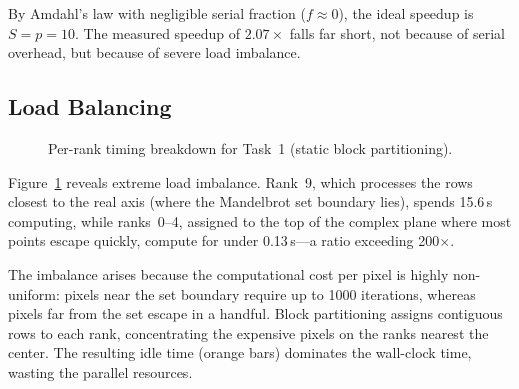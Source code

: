 \documentclass[11pt,a4paper]{article}
\begin{document}
By Amdahl's law with negligible serial fraction ($f \approx 0$), the ideal
speedup is $S = p = 10$. The measured speedup of $2.07\times$ falls far
short, not because of serial overhead, but because of severe load imbalance.

\subsection{Load Balancing}

\begin{figure}[h]\centering
{}
\caption{Per-rank timing breakdown for Task~1 (static block partitioning).}
\label{fig:task1_timing}
\end{figure}

Figure~\ref{fig:task1_timing} reveals extreme load imbalance. Rank~9,
which processes the rows closest to the real axis (where the Mandelbrot set
boundary lies), spends 15.6\,s computing, while ranks~0--4, assigned to the
top of the complex plane where most points escape quickly, compute for under
0.13\,s---a ratio exceeding 200$\times$.

The imbalance arises because the computational cost per pixel is highly
non-uniform: pixels near the set boundary require up to 1000 iterations,
whereas pixels far from the set escape in a handful. Block partitioning
assigns contiguous rows to each rank, concentrating the expensive pixels on
the ranks nearest the center. The resulting idle time (orange bars)
dominates the wall-clock time, wasting the parallel resources.
\end{document}
